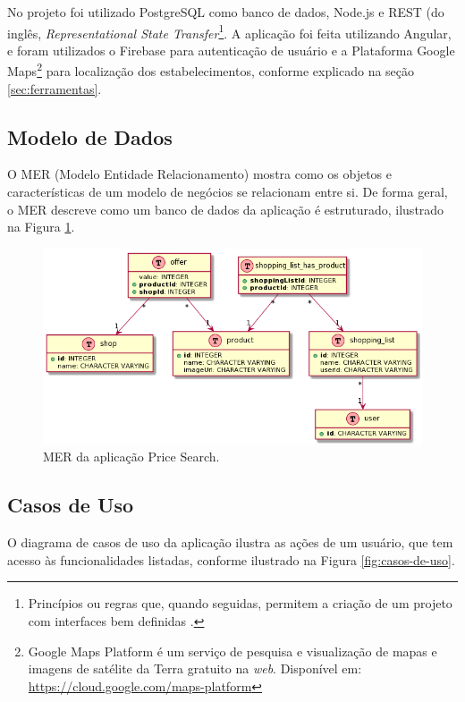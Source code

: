  No projeto foi utilizado PostgreSQL como banco de dados, Node.js e REST (do inglês, \textit{Representational State Transfer}\footnote{Princípios ou regras que, quando seguidas, permitem a criação de um projeto com interfaces bem definidas \cite{pires2017rest}.}. A aplicação foi feita utilizando Angular, e foram utilizados o Firebase para autenticação de usuário e a Plataforma Google Maps\footnote{Google Maps Platform é um serviço de pesquisa e visualização de mapas e imagens de satélite da Terra gratuito na \textit{web}. Disponível em: \url{https://cloud.google.com/maps-platform}} para localização dos estabelecimentos, conforme explicado na seção \ref{sec:ferramentas}.
 
\subsection{Modelo de Dados}
 
 O MER (Modelo Entidade Relacionamento) mostra como os objetos e características de um modelo de negócios se relacionam entre si. De forma geral, o MER descreve como um banco de dados da aplicação é estruturado, ilustrado na Figura \ref{fig:mer}.
 
 
\begin{figure}[!htb]
\centering
\includegraphics[width=\linewidth]{figuras/MER.png}
\caption{MER da aplicação Price Search.}
\label{fig:mer}
\end{figure}
 
  
 \subsection{Casos de Uso}
O diagrama de casos de uso da aplicação ilustra as ações de um usuário, que tem acesso às funcionalidades listadas, conforme ilustrado na Figura \ref{fig:casos-de-uso}.

